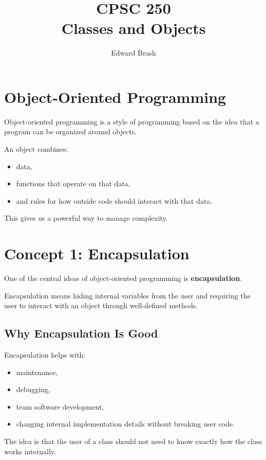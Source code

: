 \documentclass[11pt]{article}
\title{CPSC 250 \\ Classes and Objects}
\author{Edward Brash}
\date{}
\begin{document}
\maketitle

\section{Object-Oriented Programming}

Object-oriented programming is a style of programming based on the idea that a program can be organized around objects.

An object combines:

\begin{itemize}
    \item data,
    \item functions that operate on that data,
    \item and rules for how outside code should interact with that data.
\end{itemize}

This gives us a powerful way to manage complexity.

\section{Concept 1: Encapsulation}

One of the central ideas of object-oriented programming is \textbf{encapsulation}.

Encapsulation means hiding internal variables from the user and requiring the user to interact with an object through well-defined methods.

\subsection{Why Encapsulation Is Good}

Encapsulation helps with:

\begin{itemize}
    \item maintenance,
    \item debugging,
    \item team software development,
    \item changing internal implementation details without breaking user code.
\end{itemize}

The idea is that the user of a class should not need to know exactly how the class works internally.
\end{document}
